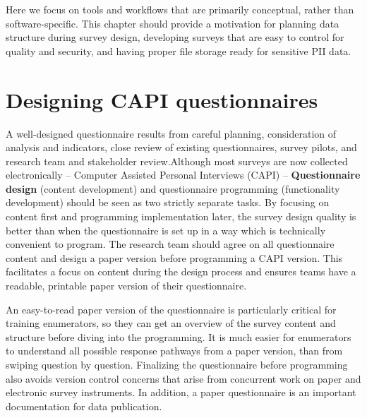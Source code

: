 
\begin{fullwidth}
	
	Here we focus on tools and workflows that are primarily conceptual, rather than software-specific. This chapter should provide a motivation for
	planning data structure during survey design,
	developing surveys that are easy to control for quality and security,
	and having proper file storage ready for sensitive PII data.
	

\end{fullwidth}


\section{Designing CAPI questionnaires}
A well-designed questionnaire results from careful planning, consideration of analysis and indicators, close review of existing questionnaires, survey pilots, and research team and stakeholder review.Although most surveys are now collected electronically -- Computer Assisted Personal Interviews (CAPI) -- 
\textbf{Questionnaire design}
(content development) and questionnaire programming (functionality development) should be seen as two strictly separate tasks. By focusing on content first and programming implementation later, the survey design quality is better than when the questionnaire is set up in a way which is technically convenient to program. The research team should agree on all questionnaire content and design a paper version before programming a CAPI version. This facilitates a focus on content during the design process and ensures teams have a readable, printable paper version of their questionnaire.  

An easy-to-read paper version of the questionnaire is particularly critical for training enumerators, so they can get an overview of the survey content and structure before diving into the programming. It is much easier for enumerators to understand all possible response pathways from a paper version, than from swiping question by question. Finalizing the questionnaire before programming also avoids version control concerns that arise from concurrent work on paper and electronic survey instruments. In addition, a paper questionnaire is an important documentation for data publication. 

